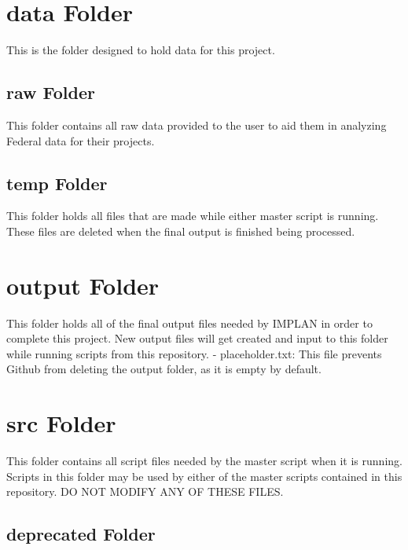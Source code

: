 \documentclass[
]{book}
\begin{document}
\hypertarget{data-folder}{%
\section{data Folder}\label{data-folder}}

This is the folder designed to hold data for this project.

\hypertarget{raw-folder}{%
\subsection{raw Folder}\label{raw-folder}}

This folder contains all raw data provided to the user to aid them in analyzing Federal data for their projects.

\hypertarget{temp-folder}{%
\subsection{temp Folder}\label{temp-folder}}

This folder holds all files that are made while either master script is running. These files are deleted when the final output is finished being processed.

\hypertarget{output-folder}{%
\section{output Folder}\label{output-folder}}

This folder holds all of the final output files needed by IMPLAN in order to complete this project. New output files will get created and input to this folder while running scripts from this repository.
- placeholder.txt: This file prevents Github from deleting the output folder, as it is empty by default.

\hypertarget{src-folder}{%
\section{src Folder}\label{src-folder}}

This folder contains all script files needed by the master script when it is running. Scripts in this folder may be used by either of the master scripts contained in this repository. DO NOT MODIFY ANY OF THESE FILES.

\hypertarget{deprecated-folder}{%
\subsection{deprecated Folder}\label{deprecated-folder}}
\end{document}
